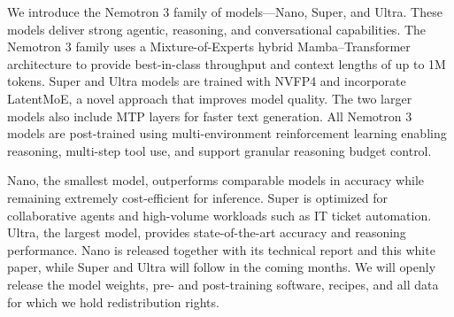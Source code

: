 \normalsize

We introduce the Nemotron 3 family of models—Nano, Super, and Ultra. These models deliver strong agentic, reasoning, and conversational capabilities. The Nemotron 3 family uses a Mixture-of-Experts hybrid Mamba–Transformer architecture to provide best-in-class throughput and context lengths of up to 1M tokens. Super and Ultra models are trained with NVFP4 and incorporate LatentMoE, a novel approach that improves model quality. The two larger models also include MTP layers for faster text generation. All Nemotron 3 models are post-trained using multi-environment reinforcement learning enabling reasoning, multi-step tool use, and support granular reasoning budget control.

Nano, the smallest model, outperforms comparable models in accuracy while remaining extremely cost-efficient for inference. Super is optimized for collaborative agents and high-volume workloads such as IT ticket automation. Ultra, the largest model, provides state-of-the-art accuracy and reasoning performance. Nano is released together with its technical report and this white paper, while Super and Ultra will follow in the coming months. We will openly release the model weights, pre- and post-training software, recipes, and all data for which we hold redistribution rights.
